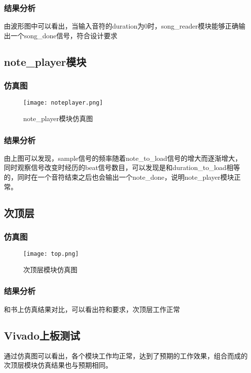 \documentclass{../source/zjureport}
\begin{document}
        \subsubsection{结果分析}
        由波形图中可以看出，当输入音符的duration为0时，song_reader模块能够正确输出一个song_done信号，符合设计要求
    
    \subsection{note_player模块}
        \subsubsection{仿真图}
        \begin{figure}[htp]
            \centering
            \texttt{[image: noteplayer.png]}
            \caption{note_player模块仿真图}
        \end{figure}

        \subsubsection{结果分析}
        由上图可以发现，sample信号的频率随着note_to_load信号的增大而逐渐增大，同时观察信号改变时经历的beat信号数目，可以发现是和duration_to_load相等的，同时在一个音符结束之后也会输出一个note_done，说明note_player模块正常。

    \subsection{次顶层}
        \subsubsection{仿真图}
        \begin{figure}[htp]
            \centering
            \texttt{[image: top.png]}
            \caption{次顶层模块仿真图}
        \end{figure}

        \subsubsection{结果分析}
        和书上仿真结果对比，可以看出符和要求，次顶层工作正常
    
    \subsection{Vivado上板测试}
    通过仿真图可以看出，各个模块工作均正常，达到了预期的工作效果，组合而成的次顶层模块仿真结果也与预期相同。
\end{document}
